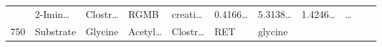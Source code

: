 \documentclass[
]{article}
\begin{document}
\begin{longtable}[]{@{}lllllllllll@{}}
\begin{minipage}[t]{0.07\columnwidth}
\strut
\end{minipage} & \begin{minipage}[t]{0.09\columnwidth}\raggedright
2-Imin\ldots{}\strut
\end{minipage} & \begin{minipage}[t]{0.07\columnwidth}\raggedright
Clostr\ldots{}\strut
\end{minipage} & \begin{minipage}[t]{0.07\columnwidth}\raggedright
RGMB\strut
\end{minipage} & \begin{minipage}[t]{0.09\columnwidth}\raggedright
creati\ldots{}\strut
\end{minipage} & \begin{minipage}[t]{0.07\columnwidth}\raggedright
0.4166\ldots{}\strut
\end{minipage} & \begin{minipage}[t]{0.07\columnwidth}\raggedright
5.3138\ldots{}\strut
\end{minipage} & \begin{minipage}[t]{0.07\columnwidth}\raggedright
1.4246\ldots{}\strut
\end{minipage} & \begin{minipage}[t]{0.03\columnwidth}\raggedright
\ldots{}\strut
\end{minipage}\tabularnewline
\begin{minipage}[t]{0.03\columnwidth}\raggedright
750\strut
\end{minipage} & \begin{minipage}[t]{0.07\columnwidth}\raggedright
Substrate\strut
\end{minipage} & \begin{minipage}[t]{0.07\columnwidth}\raggedright
Glycine\strut
\end{minipage} & \begin{minipage}[t]{0.09\columnwidth}\raggedright
Acetyl\ldots{}\strut
\end{minipage} & \begin{minipage}[t]{0.07\columnwidth}\raggedright
Clostr\ldots{}\strut
\end{minipage} & \begin{minipage}[t]{0.07\columnwidth}\raggedright
RET\strut
\end{minipage} & \begin{minipage}[t]{0.09\columnwidth}\raggedright
glycine\strut
\end{minipage} & \begin{minipage}[t]{0.07\columnwidth}\raggedright

\end{minipage}
\end{longtable}
\end{document}

